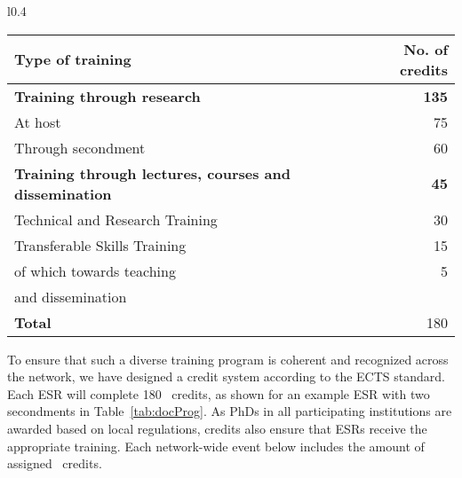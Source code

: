 \begin{wraptable}{l}{0.4\textwidth}
    \vspace{-2mm}
	\caption*{Table 1.4: Example \acronym\ doctoral program\label{tab:docProg}
	}\vspace{4mm}
	\footnotesize
	\begin{tabular}{p{45mm}r}
		\midrule
		Type of training & No. of credits \tabularnewline\midrule
		\textbf{Training through research}  & \textbf{135} \tabularnewline
		\hspace{5mm}At host & 75 \tabularnewline
		\hspace{5mm}Through secondment  & 60 \tabularnewline\midrule
		\textbf{Training through lectures, courses and dissemination} &  \textbf{45} \tabularnewline
		\hspace{5mm}Technical and Research Training & 30 \tabularnewline
		\hspace{5mm}Transferable Skills Training & 15 \tabularnewline
		\hspace{10mm}of which towards teaching & 5\tabularnewline
        \hspace{10mm}and dissemination & \tabularnewline
		\textbf{Total} &  180 \tabularnewline
		\bottomrule
	\end{tabular}
    \vspace{-2mm}
\end{wraptable}

To ensure that such a diverse training program is coherent and recognized across the network, we have designed  a \acronym credit system according to the ECTS standard. 
Each ESR will complete 180 \acronym\ credits, as shown for an example ESR with two secondments in Table~\ref{tab:docProg}.
As PhDs in all participating institutions are awarded based on local regulations, \acronym credits also ensure that ESRs receive the appropriate training. 
Each network-wide event below includes the amount of assigned \acronym\ credits.

